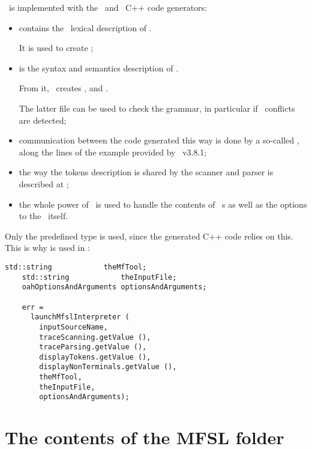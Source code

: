 \mfslLang\ is implemented with the \flex\ and \bison\ C++ code generators:
\begin{itemize}
\item {} contains the \flex\ lexical description of \mfslLang.

It is used to create ;

\item {} is the syntax and semantics description of \mfslLang.

From it, \bison\ creates ,  and .

The latter file can be used to check the grammar, in particular if \LR\ conflicts are detected;

\item communication between the code generated this way is done by a so-called , along the lines of the  example provided by \bison\ v3.8.1;

\item the way the tokens description is shared by the scanner and parser is described at ;

\item the whole power of \oahRepr\ is used to handle the contents of \mfslLang\ \script s as well as the options to the \mfslInterp\ itself.
\end{itemize}

Only the predefined  type is used, since the generated C++ code relies on this. This is why  is used in :
\begin{lstlisting}[language=CPlusPlus]
    std::string            theMfTool;
    std::string            theInputFile;
    oahOptionsAndArguments optionsAndArguments;

    err =
      launchMfslInterpreter (
        inputSourceName,
        traceScanning.getValue (),
        traceParsing.getValue (),
        displayTokens.getValue (),
        displayNonTerminals.getValue (),
        theMfTool,
        theInputFile,
        optionsAndArguments);
\end{lstlisting}


\section{The contents of the MFSL folder}

